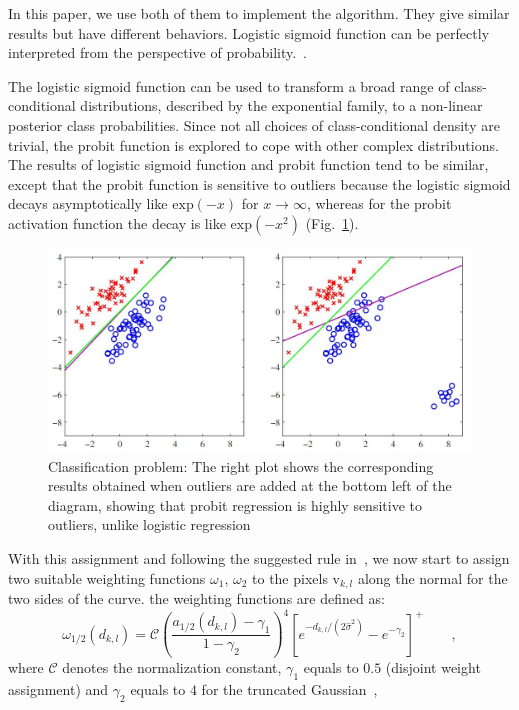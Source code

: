 \documentclass[conference]{IEEEtran}
\begin{document}
In this paper, we use both of them to implement the algorithm. They give
similar results but have different behaviors. Logistic sigmoid function
can be perfectly interpreted from the perspective of
probability.~\cite{bishop2006pattern}.

The logistic sigmoid function can be used to transform a broad range
of class-conditional distributions, described by the exponential
family, to a non-linear posterior class probabilities. Since not all choices of
class-conditional density are trivial, the probit function is explored
to cope with other complex distributions. The results of logistic
sigmoid function and probit function tend to be similar, except that the
probit function is sensitive to outliers because the logistic sigmoid
decays asymptotically like $\mathrm{exp}(-x)$ for $x \rightarrow \infty$, whereas
for the probit activation function the decay is like
$\mathrm{exp}(-x^2)$ (Fig.~\ref{fig:outliers}).
\begin{figure} 
  \includegraphics[width=\columnwidth]{images/outliers.jpg}
\caption{Classification problem: The
  right plot shows the corresponding results obtained when outliers
  are added at the bottom left of the diagram, showing  that probit
  regression is highly sensitive to outliers, unlike logistic
  regression~\cite{bishop2006pattern}}
\label{fig:outliers}
\end{figure}

With this assignment and following the suggested rule in~\cite{hanek2004contracting}, we now start to assign two suitable weighting functions
$\omega_1$, $\omega_2$ to the pixels $\mathrm{v}_{k,l}$ along the
normal for the two sides of the curve. the weighting functions are
defined as:
\begin{equation}
  \label{eq:weight}
  \omega_{1/2}(d_{k,l}) = \mathcal{C}\left(\frac{a_{1/2}(d_{k,l}) -
    \gamma_1}{1-\gamma_2}\right)^4 \left[e^{-d_{k,l}/(2\hat{\sigma}^2)} - e^{-\gamma_2}\right]^+\qquad,
\end{equation}
where $\mathcal{C}$ denotes the normalization constant, $\gamma_1$ equals to $0.5$ (disjoint weight assignment) and $\gamma_2$
equals to $4$ for the truncated Gaussian~\cite{hanek2004contracting},
\end{document}
